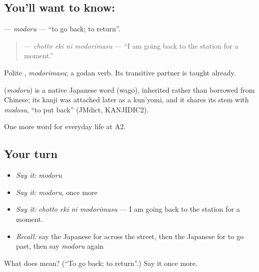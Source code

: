 \subsection*{You'll want to know: }
\textbf{} — \emph{modoru} — \textquotedblleft{}to go back; to return\textquotedblright{}.

\begin{quote}
\textbf{  } — \emph{chotto eki ni modorimasu} — \textquotedblleft{}I am going back to the station for a moment.\textquotedblright{}
\end{quote}

Polite \textbf{}, \emph{modorimasu}; a godan verb. Its transitive partner \textbf{} is taught already.

\begin{cousinweb}
\textbf{} (\emph{modoru}) is a native Japanese word (wago), inherited rather than borrowed from Chinese; its kanji was attached later as a kun'yomi, and it shares its stem with \emph{modosu}, \textquotedblleft{}to put back\textquotedblright{} (JMdict, KANJIDIC2).
\end{cousinweb}

\begin{grammarlens}[title={What you've built}]
One more word for everyday life at A2.
\end{grammarlens}

\subsection*{Your turn}
\begin{itemize}
\raggedright
  \item \emph{Say it:} \emph{modoru}
  \item \emph{Say it:} \emph{modoru}, once more
  \item \emph{Say it:} \emph{chotto eki ni modorimasu} — I am going back to the station for a moment.
  \item \emph{Recall:} say the Japanese for across the street, then the Japanese for to go past, then say \emph{modoru} again
\end{itemize}

\begin{tcolorbox}[breakable,colback=teal!4,colframe=teal!35!black,title={Before you move on}]
What does  mean? (\textquotedblleft{}To go back; to return\textquotedblright{}.) Say it once more.
\end{tcolorbox}
